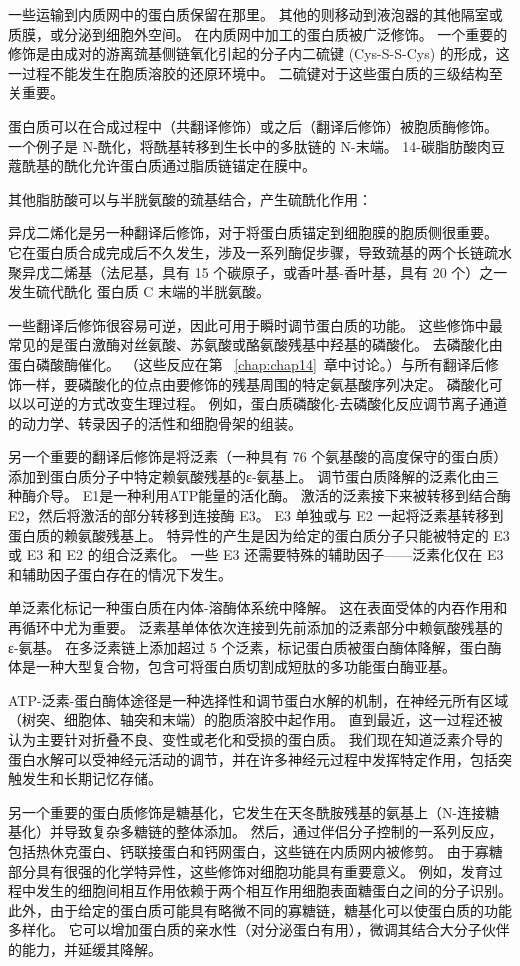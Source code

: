 一些运输到内质网中的蛋白质保留在那里。
其他的则移动到液泡器的其他隔室或质膜，或分泌到细胞外空间。
在内质网中加工的蛋白质被广泛修饰。
一个重要的修饰是由成对的游离巯基侧链氧化引起的分子内二硫键 (Cys-S-S-Cys) 的形成，这一过程不能发生在胞质溶胶的还原环境中。
二硫键对于这些蛋白质的三级结构至关重要。


蛋白质可以在合成过程中（共翻译修饰）或之后（翻译后修饰）被胞质酶修饰。
一个例子是 N-酰化，将酰基转移到生长中的多肽链的 N-末端。
14-碳脂肪酸肉豆蔻酰基的酰化允许蛋白质通过脂质链锚定在膜中。


其他脂肪酸可以与半胱氨酸的巯基结合，产生硫酰化作用：

异戊二烯化是另一种翻译后修饰，对于将蛋白质锚定到细胞膜的胞质侧很重要。
它在蛋白质合成完成后不久发生，涉及一系列酶促步骤，导致巯基的两个长链疏水聚异戊二烯基（法尼基，具有 15 个碳原子，或香叶基-香叶基，具有 20 个）之一发生硫代酰化 蛋白质 C 末端的半胱氨酸。


一些翻译后修饰很容易可逆，因此可用于瞬时调节蛋白质的功能。
这些修饰中最常见的是蛋白激酶对丝氨酸、苏氨酸或酪氨酸残基中羟基的磷酸化。
去磷酸化由蛋白磷酸酶催化。 （这些反应在第 ~\ref{chap:chap14}~章中讨论。）与所有翻译后修饰一样，要磷酸化的位点由要修饰的残基周围的特定氨基酸序列决定。
磷酸化可以以可逆的方式改变生理过程。
例如，蛋白质磷酸化-去磷酸化反应调节离子通道的动力学、转录因子的活性和细胞骨架的组装。


另一个重要的翻译后修饰是将泛素（一种具有 76 个氨基酸的高度保守的蛋白质）添加到蛋白质分子中特定赖氨酸残基的ε-氨基上。
调节蛋白质降解的泛素化由三种酶介导。
E1是一种利用ATP能量的活化酶。
激活的泛素接下来被转移到结合酶 E2，然后将激活的部分转移到连接酶 E3。
E3 单独或与 E2 一起将泛素基转移到蛋白质的赖氨酸残基上。
特异性的产生是因为给定的蛋白质分子只能被特定的 E3 或 E3 和 E2 的组合泛素化。
一些 E3 还需要特殊的辅助因子——泛素化仅在 E3 和辅助因子蛋白存在的情况下发生。


单泛素化标记一种蛋白质在内体-溶酶体系统中降解。
这在表面受体的内吞作用和再循环中尤为重要。
泛素基单体依次连接到先前添加的泛素部分中赖氨酸残基的ε-氨基。
在多泛素链上添加超过 5 个泛素，标记蛋白质被蛋白酶体降解，蛋白酶体是一种大型复合物，包含可将蛋白质切割成短肽的多功能蛋白酶亚基。


ATP-泛素-蛋白酶体途径是一种选择性和调节蛋白水解的机制，在神经元所有区域（树突、细胞体、轴突和末端）的胞质溶胶中起作用。
直到最近，这一过程还被认为主要针对折叠不良、变性或老化和受损的蛋白质。
我们现在知道泛素介导的蛋白水解可以受神经元活动的调节，并在许多神经元过程中发挥特定作用，包括突触发生和长期记忆存储。


另一个重要的蛋白质修饰是糖基化，它发生在天冬酰胺残基的氨基上（N-连接糖基化）并导致复杂多糖链的整体添加。
然后，通过伴侣分子控制的一系列反应，包括热休克蛋白、钙联接蛋白和钙网蛋白，这些链在内质网内被修剪。 
由于寡糖部分具有很强的化学特异性，这些修饰对细胞功能具有重要意义。
例如，发育过程中发生的细胞间相互作用依赖于两个相互作用细胞表面糖蛋白之间的分子识别。
此外，由于给定的蛋白质可能具有略微不同的寡糖链，糖基化可以使蛋白质的功能多样化。
它可以增加蛋白质的亲水性（对分泌蛋白有用），微调其结合大分子伙伴的能力，并延缓其降解。



